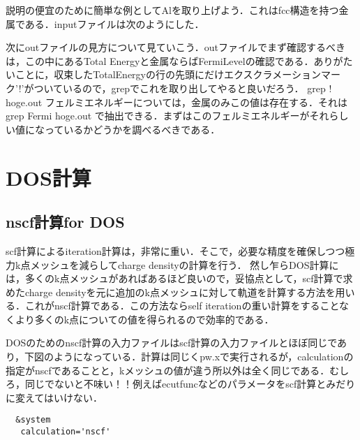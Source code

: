\documentclass[a4j]{jarticle}
\begin{document}
説明の便宜のために簡単な例としてAlを取り上げよう．これはfcc構造を持つ金属である．inputファイルは次のようにした．


次にoutファイルの見方について見ていこう．outファイルでまず確認するべきは，この中にあるTotal Energyと金属ならばFermiLevelの確認である．ありがたいことに，収束したTotalEnergyの行の先頭にだけエクスクラメーションマーク'!'がついているので，grepでこれを取り出してやると良いだろう．
grep ! hoge.out
フェルミエネルギーについては，金属のみこの値は存在する．それは
grep Fermi hoge.out
で抽出できる．まずはこのフェルミエネルギーがそれらしい値になっているかどうかを調べるべきである．



\section{DOS計算}
\subsection{nscf計算for DOS}
scf計算によるiteration計算は，非常に重い．そこで，必要な精度を確保しつつ極力k点メッシュを減らしてcharge densityの計算を行う．
 然し乍らDOS計算には，多くのk点メッシュがあればあるほど良いので，妥協点として，scf計算で求めたcharge densityを元に追加のk点メッシュに対して軌道を計算する方法を用いる．これがnscf計算である．この方法ならself iterationの重い計算をすることなくより多くのk点についての値を得られるので効率的である．

 DOSのためのnscf計算の入力ファイルはscf計算の入力ファイルとほぼ同じであり，下図のようになっている．計算は同じくpw.xで実行されるが，calculationの指定がnscfであることと，kメッシュの値が違う所以外は全く同じである．むしろ，同じでないと不味い！！例えばecutfuncなどのパラメータをscf計算とみだりに変えてはいけない．
 \begin{lstlisting}
  &system
   calculation='nscf'
 \end{lstlisting}

 
\end{document}
